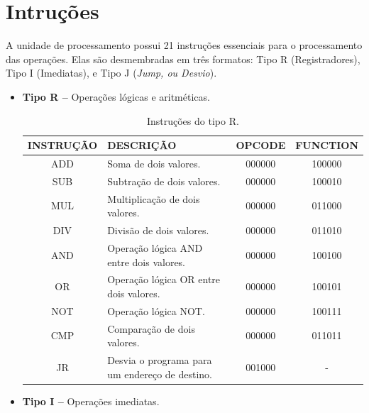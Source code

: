 \documentclass{report}
\begin{document}
  \section{Intruções}
  A unidade de processamento possui 21 instruções essenciais para o processamento das operações. Elas são desmembradas em três formatos: Tipo R (Registradores), Tipo I (Imediatas), e Tipo J (\textit{Jump, ou Desvio}).
  
  \begin{itemize}
    \item \textbf{Tipo R --} Operações lógicas e aritméticas.
    
	\begin{table}[H]
	\centering
	\begin{tabular}{|c|m{6cm}|c|c|}
  	\hline 
  	\textbf{INSTRUÇÃO} & \textbf{DESCRIÇÃO} & \textbf{OPCODE} & \textbf{FUNCTION} \\ 
  	\hline   	
  	ADD & Soma de dois valores. & 000000 & 100000 \\ \hline
  	SUB & Subtração de dois valores. & 000000 & 100010 \\ \hline
  	MUL & Multiplicação de dois valores. & 000000 & 011000 \\ \hline
  	DIV & Divisão de dois valores. & 000000 & 011010 \\ \hline
  	AND & Operação lógica AND entre dois valores. & 000000 & 100100 \\ \hline
  	OR & Operação lógica OR entre dois valores. & 000000 & 100101 \\ \hline
  	NOT & Operação lógica NOT. & 000000 & 100111 \\ \hline
  	CMP & Comparação de dois valores. & 000000 & 011011 \\ \hline
  	JR & Desvia o programa para um endereço de destino. & 001000 & - \\ \hline
  	\end{tabular} 
  	\caption{Instruções do tipo R.}
  \end{table}    

    \item \textbf{Tipo I --} Operações imediatas.
    

\end{itemize}
\end{document}
